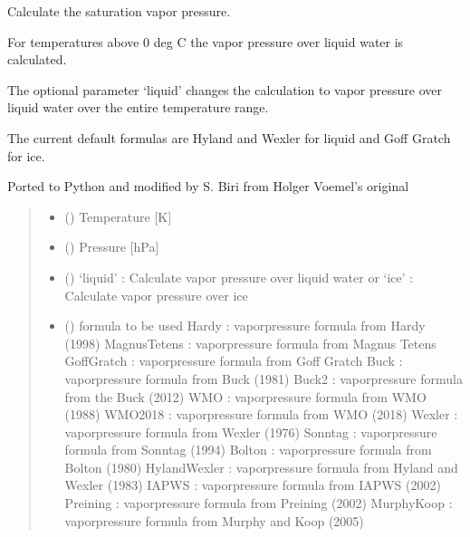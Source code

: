 \documentclass[letterpaper,10pt,english]{sphinxmanual}
\begin{document}
\begin{fulllineitems}
\label{\detokenize{users_guide:AirSeaFluxCode.hum_subs.VaporPressure}}
\pysigstartsignatures
\pysiglinewithargsret
{}
{\sphinxparamcomma {}\sphinxparamcomma {}\sphinxparamcomma {}}
{}
\pysigstopsignatures
\sphinxAtStartPar
Calculate the saturation vapor pressure.

\sphinxAtStartPar
For temperatures above 0 deg C the vapor pressure over liquid water
is calculated.

\sphinxAtStartPar
The optional parameter ‘liquid’ changes the calculation to vapor pressure
over liquid water over the entire temperature range.

\sphinxAtStartPar
The current default formulas are Hyland and Wexler for liquid and
Goff Gratch for ice.

\sphinxAtStartPar
Ported to Python and modified by S. Biri from Holger Voemel’s original
\begin{quote}\begin{description}
\begin{itemize}
\item {}
\sphinxAtStartPar
{} () \textendash{} Temperature {[}K{]}

\item {}
\sphinxAtStartPar
{} (\sphinxstyleliteralemphasis{\sphinxupquote{,}}) \textendash{} Pressure {[}hPa{]}

\item {}
\sphinxAtStartPar
{} () \textendash{} ‘liquid’ : Calculate vapor pressure over liquid water or
‘ice’ : Calculate vapor pressure over ice

\item {}
\sphinxAtStartPar
{} () \textendash{} formula to be used
Hardy               : vaporpressure formula from Hardy (1998)
MagnusTetens        : vaporpressure formula from Magnus Tetens
GoffGratch          : vaporpressure formula from Goff Gratch
Buck                : vaporpressure formula from Buck (1981)
Buck2               : vaporpressure formula from the Buck (2012)
WMO                 : vaporpressure formula from WMO (1988)
WMO2018             : vaporpressure formula from WMO (2018)
Wexler              : vaporpressure formula from Wexler (1976)
Sonntag             : vaporpressure formula from Sonntag (1994)
Bolton              : vaporpressure formula from Bolton (1980)
HylandWexler        : vaporpressure formula from Hyland and Wexler (1983)
IAPWS               : vaporpressure formula from IAPWS (2002)
Preining            : vaporpressure formula from Preining (2002)
MurphyKoop          : vaporpressure formula from Murphy and Koop (2005)


\end{itemize}
\end{description}
\end{quote}
\end{fulllineitems}
\end{document}
